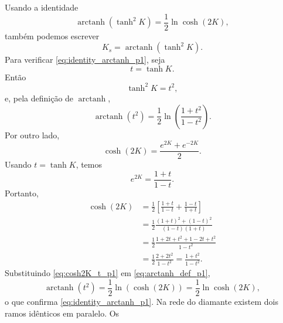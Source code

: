 \documentclass[12pt,a4paper]{article}
\begin{document}
\medskip
Usando a identidade
%
\begin{equation}
    \operatorname{arctanh}(\tanh^2K)
    =
    \frac12\ln\cosh(2K),
    \label{eq:identity_arctanh_p1}
\end{equation}
%
também podemos escrever
%
\begin{equation}
    \boxed{
    K_s=\operatorname{arctanh}(\tanh^2K).
    }
    \label{eq:Ks_arctanh_p1}
\end{equation}
%
Para verificar \eqref{eq:identity_arctanh_p1}, seja
%
\begin{equation}
    t=\tanh K.
\end{equation}
%
Então
%
\begin{equation}
    \tanh^2K=t^2,
\end{equation}
%
e, pela definição de \(\operatorname{arctanh}\),
%
\begin{equation}
    \operatorname{arctanh}(t^2)
    =
    \frac12
    \ln\left(
        \frac{1+t^2}{1-t^2}
    \right).
    \label{eq:arctanh_def_p1}
\end{equation}
%
Por outro lado,
%
\begin{equation}
    \cosh(2K)
    =
    \frac{e^{2K}+e^{-2K}}{2}.
\end{equation}
%
Usando \(t=\tanh K\), temos
%
\begin{equation}
    e^{2K}=\frac{1+t}{1-t}.
\end{equation}
%
Portanto,
%
\begin{align}
    \cosh(2K)
    &=
    \frac12
    \left[
        \frac{1+t}{1-t}
        +
        \frac{1-t}{1+t}
    \right]
    \nonumber\\[4pt]
    &=
    \frac12
    \frac{
        (1+t)^2+(1-t)^2
    }{(1-t)(1+t)}
    \nonumber\\[4pt]
    &=
    \frac12
    \frac{
        1+2t+t^2+1-2t+t^2
    }{1-t^2}
    \nonumber\\[4pt]
    &=
    \frac12
    \frac{
        2+2t^2
    }{1-t^2}
    =
    \frac{1+t^2}{1-t^2}.
    \label{eq:cosh2K_t_p1}
\end{align}
%
Substituindo \eqref{eq:cosh2K_t_p1} em \eqref{eq:arctanh_def_p1},
%
\begin{equation}
    \operatorname{arctanh}(t^2)
    =
    \frac12
    \ln\left(
        \cosh(2K)
    \right)
    =
    \frac12\ln\cosh(2K),
\end{equation}
%
o que confirma \eqref{eq:identity_arctanh_p1}.
Na rede do diamante existem dois ramos idênticos em paralelo. Os
\end{document}
